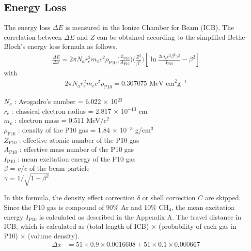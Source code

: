 \subsection{Energy Loss}
The energy loss $\Delta E$ is measured in the Ionize Chamber for Beam (ICB). The correlation between $\Delta E$ and $Z$ can be obtained according to the simplified Bethe-Bloch's energy loss formula as follows.
    \begin{align}
        \frac{\Delta E}{\Delta x} = 2\pi N_{a} r_{e}^{2} m_{e} c^{2} \rho_{\text{P10}} 
        \bigg( \frac{Z_{\text{P10}}}{A_{\text{P10}}} \bigg) \bigg( \frac{Z^{2}}{\beta^{2}} \bigg) 
        \left[ \ln \frac{2m_{e}c^{2}\beta^{2}\gamma^{2}}{I_{\text{P10}}} - \beta^{2}  \right]
    \end{align}
with
    \begin{align}
        2 \pi N_{a} r_{e}^{2} m_{e} c^{2} \rho_{\text{P10}} = 0.307075 \text{ MeV cm}^{2} \text{g}^{-1} 
    \end{align}
    \begin{adjustwidth}{1cm}{}
        $N_{a}$ : Avogadro's number = 6.022 $\times$ 10$^{23}$\\
        $r_{e}$ : classical electron radius = 2.817 $\times$ 10$^{-13}$ cm\\ 
        $m_{e}$ : electron mass = 0.511 MeV/c$^{2}$\\
        $\rho_{\text{P10}}$ : density of the P10 gas = 1.84 $\times$ 10$^{-3}$ g/cm$^{3}$\\
        $Z_{\text{P10}}$ : effective atomic number of the P10 gas\\
        $A_{\text{P10}}$ : effective mass number of the P10 gas\\
        $I_{\text{P10}}$ : mean excitation energy of the P10 gas\\ 
        $\beta$ = $v / c$ of the beam particle\\
        $\gamma$ = $1 / \sqrt{1-\beta^{2}}$
    \end{adjustwidth}
\vspace{3mm}
In this formula, the density effect correction $\delta$ or shell correction $C$ are skipped. Since the P10 gas is compound of 90$\%$ Ar and 10$\%$ CH$_{4}$, the mean excitation energy $I_{\text{P10}}$ is calculated as described in the Appendix A.
The travel distance in ICB, which is calculated as (total length of ICB) $\times$ (probability of each gas in P10) $\times$ (volume density).
\begin{align}
    \Delta x &= 51\times0.9\times0.0016608 + 51\times0.1\times0.000667 
\end{align}

